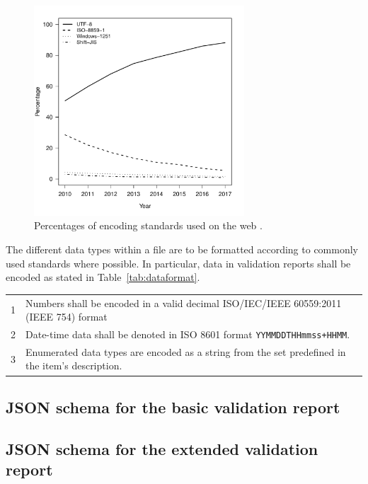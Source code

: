 \documentclass[a4paper, 11pt,titlepage]{article}
\newcommand{\code}[1]{\texttt{#1}}
\begin{document}
\begin{figure}[t]
\centering
\includegraphics[width=0.7\textwidth]{fig/encoding_use.pdf}
\caption{Percentages of encoding standards used on the web \citep{w3techs2017}.}
\label{fig:encoding}
\end{figure}

The different data types within a file are to be formatted according to
commonly used standards where possible. In particular, data in validation
reports shall be encoded as stated in Table~\ref{tab:dataformat}.
\begin{center}
\begin{tabular}{|lp{}|}
\hline
1&Numbers shall be encoded in a valid decimal ISO/IEC/IEEE 60559:2011 (IEEE 754) format \\
2&Date-time data shall be denoted in ISO 8601 format \code{YYMMDDTHHmmss+HHMM}. \\
3&Enumerated data types are encoded as a string from the set predefined in the item's description.\\
\hline
\end{tabular}
\label{tab:dataformat}
\end{center}




\cleardoublepage
\subsection{JSON schema for the basic validation report}
\label{code:basicreport}


\subsection{JSON schema for the extended validation report}


\clearpage{}

\end{document}
